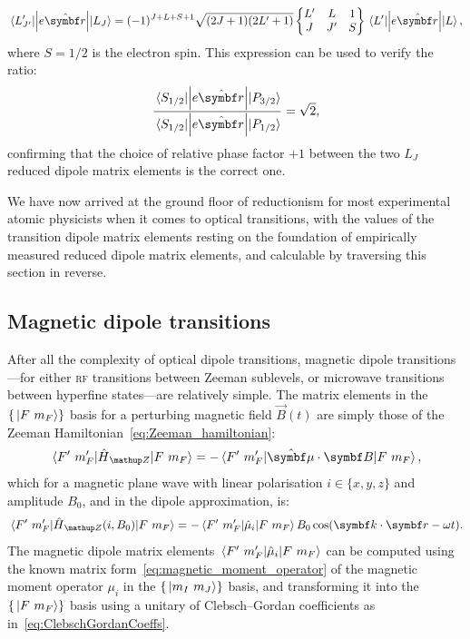 \begin{align}
\matrixel{L^\prime_{J^\prime}}{\left|e\hat{\vec r}\right|}{L_J} = 
(-1)^{J+L+S+1}\sqrt{(2J+1)(2L^\prime+1)}
\left\{\begin{matrix}
L^\prime & L & 1\\
J & J^\prime & S
\end{matrix}\right\}
\matrixel{L^\prime}{\left|e\hat{\vec r}\right|}{L},
\end{align}
where $S=1/2$ is the electron spin. This expression can be used to verify the ratio:
\begin{align}
\frac
{\matrixel{S_{1/2}}{\left|e\hat{\vec r}\right|}{P_{3/2}}}
{\matrixel{S_{1/2}}{\left|e\hat{\vec r}\right|}{P_{1/2}}} = \sqrt{2},
\end{align}
confirming that the choice of relative phase factor $+1$ between the two $L_J$ reduced dipole matrix elements is the correct one.

We have now arrived at the ground floor of reductionism for most experimental atomic physicists when it comes to optical transitions, with the values of the transition dipole matrix elements resting on the foundation of empirically measured reduced dipole matrix elements, and calculable by traversing this section in reverse.

\subsection{Magnetic dipole transitions}
After all the complexity of optical dipole transitions, magnetic dipole transitions---for either \textsc{rf} transitions between Zeeman sublevels, or microwave transitions between hyperfine states---are relatively simple. The matrix elements in the $\{\ket{F\ m_F}\}$ basis for a perturbing magnetic field $\vec B(t)$ are simply those of the Zeeman Hamiltonian~\eqref{eq:Zeeman_hamiltonian}:
\begin{align}
\matrixel{F^\prime\ m_F^\prime}{\hat H_\up{Z}}{F\ m_F}
=
-\matrixel{F^\prime\ m_F^\prime}{\hat{\vec\mu}\cdot {\vec B}}{F\ m_F},
\end{align} 
which for a magnetic plane wave with linear polarisation $i\in \{x, y, z\}$ and amplitude $B_0$, and in the dipole approximation, is:
\begin{align}
\matrixel{F^\prime\ m_F^\prime}{\hat H_\up{Z}(i, B_0)}{F\ m_F}
=
-\matrixel{F^\prime\ m_F^\prime}{\hat{\mu}_i}{F\ m_F}B_0 \cos(\vec k\cdot \vec r - \omega t).
\end{align}
The magnetic dipole matrix elements $\matrixel{F^\prime\ m_F^\prime}{\hat{\mu}_i}{F\ m_F}$ can be computed using the known matrix form~\eqref{eq:magnetic_moment_operator} of the magnetic moment operator $\mu_i$ in the $\{\ket{m_I\ m_J}\}$ basis, and transforming it into the $\{\ket{F\ m_F}\}$ basis using a unitary of Clebsch--Gordan coefficients as in~\eqref{eq:ClebschGordanCoeffs}.

